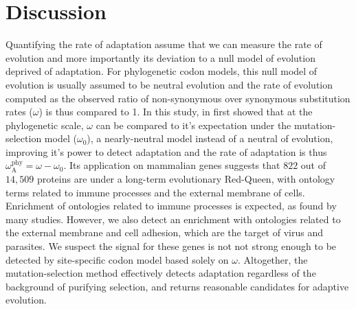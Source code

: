 \documentclass{article}
\newcommand{\rateApop}{\omega_{\mathrm{A}}}
\newcommand{\rateAphy}{\rateApop^{\mathrm{phy}}}
\begin{document}
    \section*{Discussion}\label{sec:discussion}

    Quantifying the rate of adaptation assume that we can measure the rate of evolution and more importantly its deviation to a null model of evolution deprived of adaptation.
    For phylogenetic codon models, this null model of evolution is usually assumed to be neutral evolution and the rate of evolution computed as the observed ratio of non-synonymous over synonymous substitution rates ($\omega$) is thus compared to 1.
    In this study, in first showed that at the phylogenetic scale, $\omega$ can be compared to it's expectation under the mutation-selection model ($\omega_{0}$), a nearly-neutral model instead of a neutral of evolution, improving it's power to detect adaptation and the rate of adaptation is thus $\rateAphy = \omega - \omega_{0}$.
    Its application on mammalian genes suggests that $822$ out of $14,509$ proteins are under a long-term evolutionary Red-Queen, with ontology terms related to immune processes and the external membrane of cells.
    Enrichment of ontologies related to immune processes is expected, as found by many studies\cite{kosiol_patterns_2008, enard_viruses_2016, ebel_high_2017}.
    However, we also detect an enrichment with ontologies related to the external membrane and cell adhesion, which are the target of virus and parasites.
    We suspect the signal for these genes is not not strong enough to be detected by site-specific codon model based solely on $\omega$.
    Altogether, the mutation-selection method effectively detects adaptation regardless of the background of purifying selection, and returns reasonable candidates for adaptive evolution.
\end{document}
